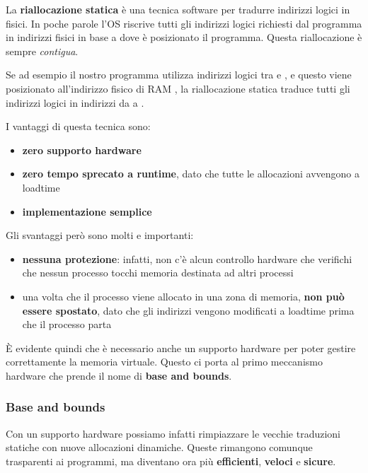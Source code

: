 \documentclass[11pt, a4paper, titlepage, oneside]{scrbook}
\begin{document}
\begin{Definizione}
\label{def-riallocazione-statica}
La \textbf{riallocazione statica} è una tecnica software per tradurre indirizzi logici in fisici. In poche parole l'OS riscrive tutti gli indirizzi logici richiesti dal programma in indirizzi fisici in base a dove è posizionato il programma. Questa riallocazione è sempre \textit{contigua}.
\end{Definizione}

Se ad esempio il nostro programma utilizza indirizzi logici tra  e , e questo viene posizionato all'indirizzo fisico di RAM , la riallocazione statica traduce tutti gli indirizzi logici in indirizzi da  a .

I vantaggi di questa tecnica sono:
\begin{itemize}
    \item \textbf{zero supporto hardware}
    \item \textbf{zero tempo sprecato a runtime}, dato che tutte le allocazioni avvengono a loadtime
    \item \textbf{implementazione semplice}
\end{itemize}

Gli svantaggi però sono molti e importanti:
\begin{itemize}
    \item \textbf{nessuna protezione}: infatti, non c'è alcun controllo hardware che verifichi che nessun processo tocchi memoria destinata ad altri processi
    \item una volta che il processo viene allocato in una zona di memoria, \textbf{non può essere spostato}, dato che gli indirizzi vengono modificati a loadtime prima che il processo parta 
\end{itemize}

È evidente quindi che è necessario anche un supporto hardware per poter gestire correttamente la memoria virtuale. Questo ci porta al primo meccanismo hardware che prende il nome di \textbf{base and bounds}. 

\subsubsection*{Base and bounds}

Con un supporto hardware possiamo infatti rimpiazzare le vecchie traduzioni statiche con nuove allocazioni dinamiche. Queste rimangono comunque trasparenti ai programmi, ma diventano ora più \textbf{efficienti}, \textbf{veloci} e \textbf{sicure}. 
\end{document}
